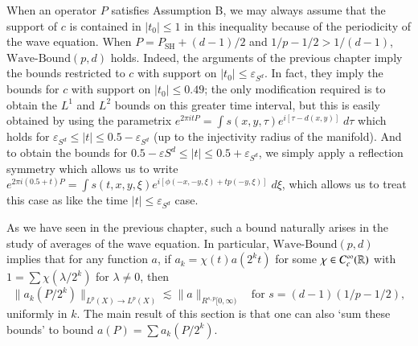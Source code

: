 When an operator $P$ satisfies Assumption B, we may always assume that the support of $c$ is contained in $|t_0| \leq 1$ in this inequality because of the periodicity of the wave equation. When $P = P_{\text{SH}} + (d-1)/2$ and $1/p - 1/2 > 1/(d-1)$, $\text{Wave-Bound}(p,d)$ holds. Indeed, the arguments of the previous chapter imply the bounds restricted to $c$ with support on $|t_0| \leq \varepsilon_{S^d}$. In fact, they imply the bounds for $c$ with support on $|t_0| \leq 0.49 $; the only modification required is to obtain the $L^1$ and $L^2$ bounds on this greater time interval, but this is easily obtained by using the parametrix $e^{2 \pi i t P} = \int s(x,y,\tau) e^{i [\tau - d(x,y)]}\; d\tau$ which holds for $\varepsilon_{S^d} \leq |t| \leq 0.5 - \varepsilon_{S^d}$ (up to the injectivity radius of the manifold). And to obtain the bounds for $0.5 - \varepsilon{S^d} \leq |t| \leq 0.5 + \varepsilon_{S^d}$, we simply apply a reflection symmetry which allows us to write $e^{2 \pi i (0.5 + t) P} = \int s(t,x,y,\xi) e^{i [ \phi(-x,-y,\xi) + t p(-y,\xi) ]}\; d\xi$, which allows us to treat this case as like the time $|t| \leq \varepsilon_{S^d}$ case.

As we have seen in the previous chapter, such a bound naturally arises in the study of averages of the wave equation. In particular, $\text{Wave-Bound}(p,d)$ implies that for any function $a$, if $a_k = \chi(t) a(2^k t)$ for some $\chi \in C_c^\infty(\operatorname{\mathbb{R}})$ with $1 = \sum \chi(\lambda/2^k)$ for $\lambda \neq 0$, then
%
\begin{equation}
    \| a_k(P/2^k) \|_{L^p(X) \to L^p(X)} \lesssim \| a \|_{R^{s,p}[0,\infty)} \quad\text{for $s = (d-1)(1/p - 1/2)$},
\end{equation}
%
uniformly in $k$. The main result of this section is that one can also `sum these bounds' to bound $a(P) = \sum a_k(P/2^k)$.

\thmatomicscalestheorem*


